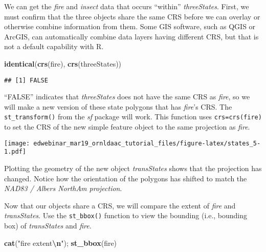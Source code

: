 \documentclass[
]{article}
\newenvironment{Shaded}{\begin{snugshade}}{\end{snugshade}}
\newcommand{\AttributeTok}[1]{\textcolor[rgb]{0.13,0.29,0.53}{#1}}
\newcommand{\CommentTok}[1]{\textcolor[rgb]{0.56,0.35,0.01}{\textit{#1}}}
\newcommand{\FunctionTok}[1]{\textcolor[rgb]{0.13,0.29,0.53}{\textbf{#1}}}
\newcommand{\NormalTok}[1]{#1}
\newcommand{\OtherTok}[1]{\textcolor[rgb]{0.56,0.35,0.01}{#1}}
\newcommand{\SpecialCharTok}[1]{\textcolor[rgb]{0.81,0.36,0.00}{\textbf{#1}}}
\newcommand{\StringTok}[1]{\textcolor[rgb]{0.31,0.60,0.02}{#1}}
\begin{document}
We can get the \emph{fire} and \emph{insect} data that occurs ``within''
\emph{threeStates}. First, we must confirm that the three objects share
the same CRS before we can overlay or otherwise combine information from
them. Some GIS software, such as QGIS or ArcGIS, can automatically
combine data layers having different CRS, but that is not a default
capability with R.

\begin{Shaded}
\begin{Highlighting}[]
\FunctionTok{identical}\NormalTok{(}\FunctionTok{crs}\NormalTok{(fire), }\FunctionTok{crs}\NormalTok{(threeStates))}
\end{Highlighting}
\end{Shaded}

\begin{verbatim}
## [1] FALSE
\end{verbatim}

``FALSE'' indicates that \emph{threeStates} does not have the same CRS
as \emph{fire}, so we will make a new version of these state polygons
that has \emph{fire}'s CRS. The \texttt{st\_transform()} from the
\emph{sf} package will work. This function uses \texttt{crs=crs(fire)}
to set the CRS of the new simple feature object to the same projection
as \emph{fire}.

\begin{Shaded}
\end{Shaded}

\texttt{[image: edwebinar\_mar19\_ornldaac\_tutorial\_files/figure-latex/states\_5-1.pdf]}

Plotting the geometry of the new object \emph{transStates} shows that
the projection has changed. Notice how the orientation of the polygons
has shifted to match the \emph{NAD83 / Albers NorthAm projection}.

Now that our objects share a CRS, we will compare the extent of
\emph{fire} and \emph{transStates}. Use the \texttt{st\_bbox()} function
to view the bounding (i.e., bounding box) of \emph{transStates} and
\emph{fire}.

\begin{Shaded}
\begin{Highlighting}[]
\FunctionTok{cat}\NormalTok{(}\StringTok{"fire extent}\SpecialCharTok{\textbackslash{}n}\StringTok{"}\NormalTok{); }\FunctionTok{st\_bbox}\NormalTok{(fire)}
\end{Highlighting}
\end{Shaded}
\end{document}
